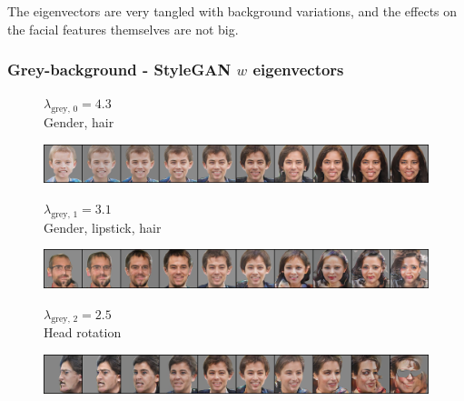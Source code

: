 \documentclass{article}
\begin{document}
The eigenvectors are very tangled with background variations, and the effects on the facial features themselves are not big.

\subsubsection*{Grey-background - StyleGAN $w$ eigenvectors}

\begin{figure}[H]
  \centering
  \begin{minipage}{.18\linewidth}
      \centering
      $\lambda_{\text{grey, 0}} = 4.3$ \\
      Gender, hair
  \end{minipage}%
  \hfill
  \begin{minipage}{.81\linewidth}
      \centering
      \includegraphics[width=\linewidth]{eigen/grey_gan_0.png}
  \end{minipage}
\end{figure}

\begin{figure}[H]
  \centering
  \begin{minipage}{.18\linewidth}
      \centering
      $\lambda_{\text{grey, 1}} = 3.1$ \\
      Gender, lipstick, hair
  \end{minipage}%
  \hfill
  \begin{minipage}{.81\linewidth}
      \centering
      \includegraphics[width=\linewidth]{eigen/grey_gan_1.png}
  \end{minipage}
\end{figure}

\begin{figure}[H]
  \centering
  \begin{minipage}{.18\linewidth}
      \centering
      $\lambda_{\text{grey, 2}} = 2.5$ \\
      Head rotation
  \end{minipage}%
  \hfill
  \begin{minipage}{.81\linewidth}
      \centering
      \includegraphics[width=\linewidth]{eigen/grey_gan_2.png}
  \end{minipage}
\end{figure}
  
\end{document}
